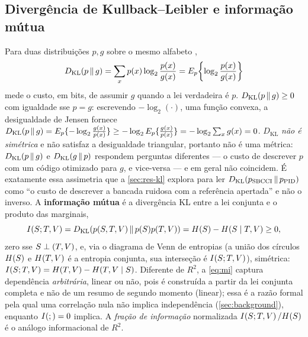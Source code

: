 \subsection{Divergência de Kullback--Leibler e informação mútua}
\label{sec:th-mi}
Para duas distribuições $p,g$ sobre o mesmo alfabeto \cite{cover2006},
\begin{equation}
  D_{\mathrm{KL}}\!\left(p \,\|\, g\right) = \sum_x p(x)\log_2\frac{p(x)}{g(x)} = E_p\!\left\{\log_2\frac{p(x)}{g(x)}\right\}
  \label{eq:kl}
\end{equation}
mede o custo, em bits, de assumir $g$ quando a lei verdadeira é $p$.
$D_{\mathrm{KL}}\!\left(p \,\|\, g\right)\ge0$ com igualdade sse $p=g$: escrevendo $-\log_2(\cdot)$, uma
função convexa, a desigualdade de Jensen fornece
$D_{\mathrm{KL}}\!\left(p \,\|\, g\right)=E_p\{-\log_2\frac{g(x)}{p(x)}\}\ge-\log_2 E_p\{\frac{g(x)}{p(x)}\}=-\log_2\sum_x g(x)=0$.
$D_{\mathrm{KL}}$ \emph{não é simétrica} e não satisfaz a desigualdade
triangular, portanto não é uma métrica: $D_{\mathrm{KL}}\!\left(p \,\|\, g\right)$ e $D_{\mathrm{KL}}\!\left(g \,\|\, p\right)$ respondem
perguntas diferentes --- o custo de descrever $p$ com um código otimizado
para $g$, e vice-versa --- e em geral não coincidem. É exatamente essa
assimetria que a \cref{sec:res-kl} explora para ler
$D_{\mathrm{KL}}\!\left(p_{\text{SBCCI}} \,\|\, p_{\text{PID}}\right)$ como ``o custo de descrever a bancada
ruidosa com a referência apertada'' e não o inverso. A \textbf{informação mútua} é a divergência KL entre a lei conjunta
e o produto das marginais,
\begin{equation}
  I\!\left(S ; T,V\right) = D_{\mathrm{KL}}\!\left(p(S,T,V) \,\|\, p(S)p(T,V)\right)
  = H\!\left(S\right)-H\!\left(S\mid T,V\right) \ge 0,
  \label{eq:mi}
\end{equation}
zero sse $S\perp(T,V)$, e, via o diagrama de Venn de entropias (a
união dos círculos $H\!\left(S\right)$ e $H\!\left(T,V\right)$ é a entropia conjunta,
sua interseção é $I\!\left(S ; T,V\right)$), simétrica:
$I\!\left(S ; T,V\right)=H\!\left(T,V\right)-H\!\left(T,V\mid S\right)$.
Diferente de $R^2$, a \cref{eq:mi} captura dependência \emph{arbitrária},
linear ou não, pois é construída a partir da lei conjunta completa e não de
um resumo de segundo momento (linear); essa é a razão formal pela qual uma
correlação nula não implica independência (\cref{sec:background}), enquanto
$I\!\left( ; \right)=0$ implica. A \emph{fração de informação} normalizada
$I\!\left(S ; T,V\right)/H\!\left(S\right)$ é o análogo informacional de
$R^2$.

